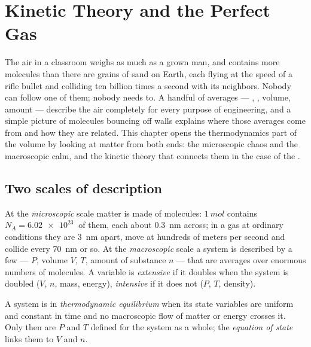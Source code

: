 \chapter{Kinetic Theory and the Perfect Gas}\label{ch:b1:kinetic-theory}

The air in a classroom weighs as much as a grown man, and contains more
molecules than there are grains of sand on Earth, each flying at the
speed of a rifle bullet and colliding ten billion times a second with
its neighbors. Nobody can follow one of them; nobody needs to. A handful
of averages --- , , volume, amount --- describe the
air completely for every purpose of engineering, and a simple picture
of molecules bouncing off walls explains where those averages come
from and how they are related. This chapter opens the thermodynamics
part of the volume by looking at matter from both ends: the microscopic
chaos and the macroscopic calm, and the kinetic theory that connects
them in the case of the .

\section{Two scales of description}

\begin{definition}\label{def:b1:kinetic-theory:scales}
At the \emph{microscopic} scale matter is made of molecules: $\qty{1}{mol}$
contains $N_A = \qty{6.02e23}{}$ of them, each about \qty{0.3}{nm} across;
in a gas at ordinary conditions they are \qty{3}{nm} apart, move at
hundreds of meters per second and collide every \qty{70}{nm} or so.
At the \emph{macroscopic} scale a system is described by a few
\emph{} ---  $P$, volume $V$,  $T$,
amount of substance $n$ --- that are averages over enormous numbers of
molecules. A variable is \emph{extensive} if it doubles when the system
is doubled ($V$, $n$, mass, energy), \emph{intensive} if it does not
($P$, $T$, density).
\end{definition}

\begin{definition}\label{def:b1:kinetic-theory:equilibrium}
A system is in \emph{thermodynamic equilibrium} when its state variables
are uniform and constant in time and no macroscopic flow of matter or
energy crosses it. Only then are $P$ and $T$ defined for the system as a
whole; the \emph{equation of state} links them to $V$ and $n$.
\end{definition}

